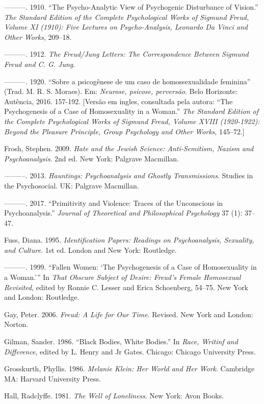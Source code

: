 ---------. 1910. ``The Psycho-Analytic View of Psychogenic Disturbance
of Vision.'' \emph{The Standard Edition of the Complete Psychological
Works of Sigmund Freud, Volume XI (1910): Five Lectures on
Psycho-Analysis, Leonardo Da Vinci and Other Works}, 209--18.

---------. 1912. \emph{The Freud/Jung Letters: The Correspondence
Between Sigmund Freud and C. G. Jung}.

---------. 1920. ``Sobre a psicogênese de um caso de homossexualidade
feminina'' (Trad. M. R. S. Moraes). Em: \emph{Neurose, psicose,
perversão}. Belo Horizonte: Autência, 2016. 157-192. {[}Versão em
ingles, consultada pela autora: ``The Psychogenesis of a Case of
Homosexuality in a Woman.'' \emph{The Standard Edition of the Complete
Psychological Works of Sigmund Freud, Volume XVIII (1920-1922): Beyond
the Pleasure Principle, Group Psychology and Other Works}, 145--72.{]}

Frosh, Stephen. 2009. \emph{Hate and the Jewish Science: Anti-Semitism,
Nazism and Psychoanalysis}. 2nd ed. New York: Palgrave Macmillan.

---------. 2013. \emph{Hauntings: Psychoanalysis and Ghostly
Transmissions}. Studies in the Psychosocial. UK: Palgrave Macmillan.

---------. 2017. ``Primitivity and Violence: Traces of the Unconscious
in Psychoanalysis.'' \emph{Journal of Theoretical and Philosophical
Psychology} 37 (1): 37--47.

Fuss, Diana. 1995. \emph{Identification Papers: Readings on
Psychoanalysis, Sexuality, and Culture}. 1st ed. London and New York:
Routledge.

---------. 1999. ``Fallen Women: `The Psychogenesis of a Case of
Homosexuality in a Woman.''' In \emph{That Obscure Subject of Desire:
Freud's Female Homosexual Revisited}, edited by Ronnie C. Lesser and
Erica Schoenberg, 54--75. New York and London: Routledge.

Gay, Peter. 2006. \emph{Freud: A Life for Our Time}. Revised. New York
and London: Norton.

Gilman, Sander. 1986. ``Black Bodies, White Bodies.'' In \emph{Race,
Writinf and Difference}, edited by L. Henry and Jr Gates. Chicago:
Chicago University Press.

Grosskurth, Phyllis. 1986. \emph{Melanie Klein: Her World and Her Work}.
Cambridge MA: Harvard University Press.

Hall, Radclyffe. 1981. \emph{The Well of Loneliness}. New York: Avon
Books.


